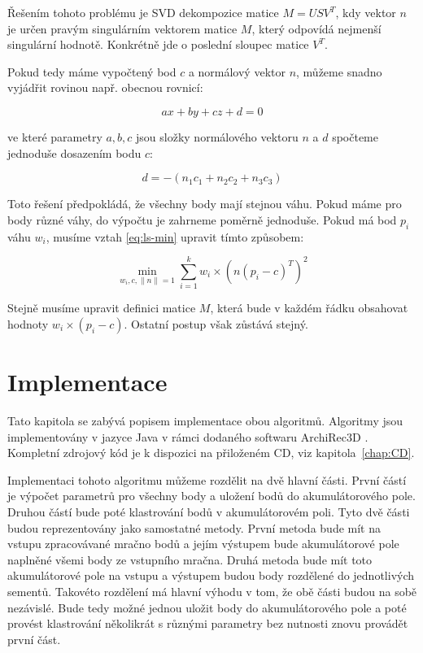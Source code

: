\documentclass[11pt,twoside,a4paper]{book}
\begin{document}
Řešením tohoto problému je SVD dekompozice matice $M = USV^T$, kdy vektor $n$ je určen pravým singulárním vektorem matice $M$, který odpovídá nejmenší singulární hodnotě. Konkrétně jde o poslední sloupec matice $V^T$.

Pokud tedy máme vypočtený bod $c$ a normálový vektor $n$, můžeme snadno vyjádřit rovinou např. obecnou rovnicí:

\begin{equation}
ax + by + cz + d = 0
\end{equation}

\noindent
ve které parametry $a, b, c$ jsou složky normálového vektoru $n$ a $d$ spočteme jednoduše dosazením bodu $c$:

\begin{equation}
\label{eq:d}
d = -(n_1c_1 + n_2c_2 + n_3c_3)
\end{equation}

Toto řešení předpokládá, že všechny body mají stejnou váhu. Pokud máme pro body různé váhy, do výpočtu je zahrneme poměrně jednoduše. Pokud má bod $p_i$ váhu $w_i$, musíme vztah \ref{eq:ls-min} upravit tímto způsobem:

\begin{equation}
\min_{w_i,c,\|n\|=1} \sum\limits_{i=1}^k w_i \times (n (p_i - c)^T)^2
\end{equation}

Stejně musíme upravit definici matice $M$, která bude v každém řádku obsahovat hodnoty $w_i \times (p_i - c)$. Ostatní postup však zůstává stejný.

\chapter{Implementace}
\label{chap:implementace}

Tato kapitola se zabývá popisem implementace obou algoritmů. Algoritmy jsou implementovány v jazyce Java v rámci dodaného softwaru ArchiRec3D \cite{AR3D}. Kompletní zdrojový kód je k dispozici na přiloženém CD, viz kapitola~\ref{chap:CD}.


Implementaci tohoto algoritmu můžeme rozdělit na dvě hlavní části. První částí je výpočet parametrů pro všechny body a uložení bodů do akumulátorového pole. Druhou částí bude poté klastrování bodů v akumulátorovém poli. Tyto dvě části budou reprezentovány jako samostatné metody. První metoda bude mít na vstupu zpracovávané mračno bodů a jejím výstupem bude akumulátorové pole naplněné všemi body ze vstupního mračna. Druhá metoda bude mít toto akumulátorové pole na vstupu a výstupem budou body rozdělené do jednotlivých sementů. Takovéto rozdělení má hlavní výhodu v tom, že obě části budou na sobě nezávislé. Bude tedy možné jednou uložit body do akumulátorového pole a poté provést klastrování několikrát s různými parametry bez nutnosti znovu provádět první část.
\end{document}
